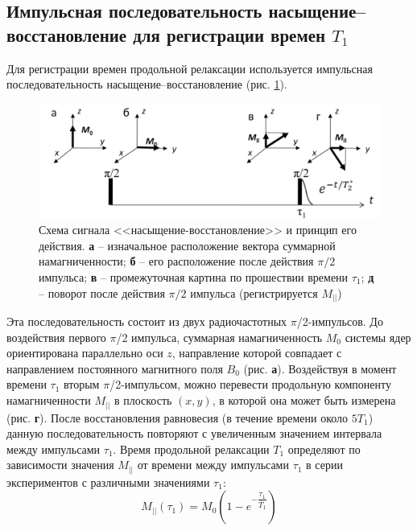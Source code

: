 \subsection{Импульсная последовательность насыщение–восстановление для регистрации времен $T_1$ }
Для регистрации времен продольной релаксации используется импульсная последовательность насыщение–восстановление (рис. \ref{fig:2019-02-111}).
\begin{figure}
	\centering
	\includegraphics[width=0.7\linewidth]{2019-02-111}
	\caption{Схема сигнала <<насыщение-восстановление>> и принцип его действия. \textbf{а} -- изначальное расположение вектора суммарной намагниченности; \textbf{б} -- его расположение после действия $ \pi /2 $ импульса; \textbf{в} -- промежуточная картина по прошествии времени $ \tau_1 $; \textbf{д} -- поворот после действия $ \pi /2 $ импульса (регистрируется $ M_{||} $)}
	\label{fig:2019-02-111}
\end{figure}
Эта последовательность состоит из двух радиочастотных $\pi$/2-импульсов. 
До воздействия первого $\pi$/2 импульса, суммарная намагниченность $M_0$ системы ядер ориентирована параллельно оси $z$, направление которой совпадает с направлением постоянного магнитного поля $B_0$ (рис. \textbf{а}). 
Воздействуя в момент времени $\tau_1$ вторым $\pi$/2-импульсом, можно перевести продольную компоненту намагниченности $M_{||}$ в плоскость $(x, y)$, в которой она может быть измерена (рис. \textbf{г}).
После восстановления равновесия (в течение времени около $5T_1$) данную последовательность повторяют с увеличенным значением интервала между импульсами $\tau_1$. 
Время продольной релаксации $T_1$ определяют по зависимости значения $M_{||}$ от времени между импульсами $\tau_1$ в серии экспериментов с различными значениями $\tau_1$: 
\begin{equation}
\label{eq:T1-def}
M_{||}(\tau_1)= M_0 \left(1-e^{-\dfrac{\tau_1}{T_1}} \right)
\end{equation}
